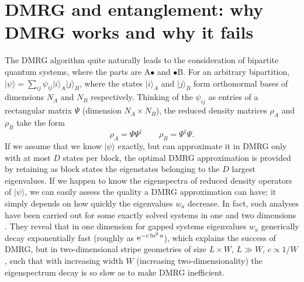 \documentclass[a4paper,10pt,oneside,onecolumn,1p,times]{elsarticle}
\newcommand{\eul}{{\rm e }}
\newcommand{\ket}[1]{\mbox{$| #1  \rangle$}}
\begin{document}
\section{DMRG and entanglement: why DMRG works and why it fails}
The DMRG algorithm quite naturally leads to the consideration of bipartite quantum systems, where the parts are A$\bullet$ and $\bullet$B. For an arbitrary bipartition,  $\ket{\psi} = \sum_{ij} \psi_{ij} \ket{i}_A \ket{j}_B$, where the states $\ket{i}_A$ and $\ket{j}_B$ form orthonormal bases of dimensions $N_A$ and $N_B$ respectively. Thinking of the $\psi_{ij}$ as entries of a rectangular matrix $\Psi$ (dimension $N_A \times N_B$), the reduced density matrices $\rho_A$ and $\rho_B$ take the form
\begin{equation}
\rho_A = \Psi \Psi^\dagger \quad\quad \rho_B = \Psi^\dagger \Psi.
\label{eq:ABdensityoperators}
\end{equation}
If we assume that we know $\ket{\psi}$ exactly, but can approximate it in DMRG only with at most $D$ states per block, the optimal DMRG approximation is provided by retaining as block states the eigenstates belonging to the $D$ largest eigenvalues. If we happen to know the eigenspectra of reduced density operators of $\ket{\psi}$, we can easily assess the quality a DMRG approximation can have; it simply depends on how quickly the eigenvalues $w_a$ decrease. In fact, such analyses have been carried out for some exactly solved systems in one and two dimensions \cite{Peschel99,Okunishi99,Chung00,Chung01,Chan02}. They reveal that in one dimension for gapped systems eigenvalues $w_a$  generically decay exponentially fast (roughly as $\eul^{- c \ln^2 a}$), which explains the success of DMRG, but in two-dimensional stripe geometries of size $L \times W$, $L\gg W$, $c \propto 1/W$, such that with increasing width $W$ (increasing two-dimensionality) the eigenspectrum decay is so slow as to make DMRG inefficient. 
\end{document}
